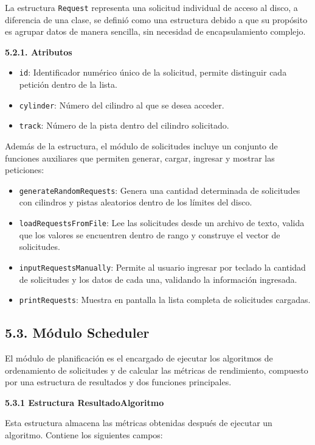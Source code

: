 \documentclass[14pt,letterpaper]{extarticle}
\begin{document}
La estructura \texttt{Request} representa una solicitud individual de acceso al disco, a diferencia de una clase, se definió como una estructura debido a que su propósito es agrupar datos de manera sencilla, sin necesidad de encapsulamiento complejo.

\textbf{5.2.1. Atributos}

\begin{itemize}
    \item \texttt{id}: Identificador numérico único de la solicitud, permite distinguir cada petición dentro de la lista.
    \item \texttt{cylinder}: Número del cilindro al que se desea acceder.
    \item \texttt{track}: Número de la pista dentro del cilindro solicitado.
\end{itemize}

Además de la estructura, el módulo de solicitudes incluye un conjunto de funciones auxiliares que permiten generar, cargar, ingresar y mostrar las peticiones:

\begin{itemize}
    \item \texttt{generateRandomRequests}: Genera una cantidad determinada de solicitudes con cilindros y pistas aleatorios dentro de los límites del disco.
    \item \texttt{loadRequestsFromFile}: Lee las solicitudes desde un archivo de texto, valida que los valores se encuentren dentro de rango y construye el vector de solicitudes.
    \item \texttt{inputRequestsManually}: Permite al usuario ingresar por teclado la cantidad de solicitudes y los datos de cada una, validando la información ingresada.
    \item \texttt{printRequests}: Muestra en pantalla la lista completa de solicitudes cargadas.
\end{itemize}

\subsection*{5.3. Módulo Scheduler}

El módulo de planificación es el encargado de ejecutar los algoritmos de ordenamiento de solicitudes y de calcular las métricas de rendimiento, compuesto por una estructura de resultados y dos funciones principales.

\textbf{5.3.1 Estructura ResultadoAlgoritmo}

Esta estructura almacena las métricas obtenidas después de ejecutar un algoritmo. Contiene los siguientes campos:
\end{document}
